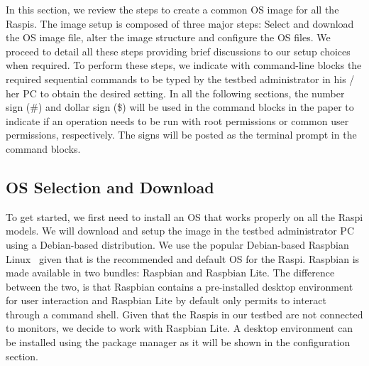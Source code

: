 \label{sec:image_setup}
In this section, we review the steps to create a common \ac{OS} image for
all the \ac{Raspi}s. The image setup is composed of three major steps:
Select and download the \ac{OS} image file, alter the image structure and
configure the \ac{OS} files. We proceed to detail all these steps providing
brief discussions to our setup choices when required. To perform these
steps, we indicate with command-line blocks the required sequential
commands to be typed by the testbed administrator in his / her \ac{PC}
to obtain the desired setting. In all the following sections, the number
sign (\#) and dollar sign (\$) will be used in the command blocks in the
paper to indicate if an operation needs to be run with root permissions or
common user permissions, respectively. The signs will be posted as the
terminal prompt in the command blocks.

\subsection{OS Selection and Download}

To get started, we first need to install an \ac{OS} that works properly
on all the \ac{Raspi} models. We will download and setup the image in
the testbed administrator \ac{PC} using a Debian-based distribution. We
use the popular Debian-based Raspbian Linux~\cite{raspbian} given that is
the recommended and default \ac{OS} for the \ac{Raspi}. Raspbian is made
available in two bundles: Raspbian and Raspbian Lite. The difference
between the two, is that Raspbian contains a pre-installed desktop environment
for user interaction and Raspbian Lite by default only permits to interact
through a command shell. Given that the \ac{Raspi}s in our testbed are not
connected to monitors, we decide to work with Raspbian Lite.
A desktop environment can be installed using the package manager
as it will be shown in the configuration section.


